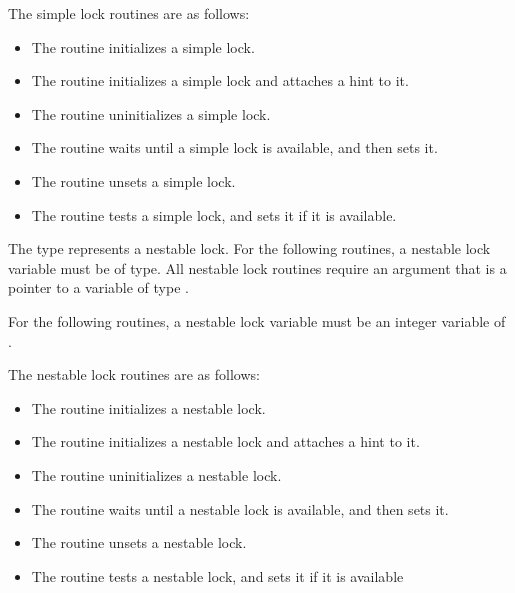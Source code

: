 The simple lock routines are as follows:

\begin{itemize}
\item The  routine initializes a simple lock.

\item The  routine initializes a simple lock and attaches a hint to it.

\item The  routine uninitializes a simple lock.

\item The  routine waits until a simple lock is available, and then sets it.

\item The  routine unsets a simple lock.

\item The  routine tests a simple lock, and sets it if it is available.
\end{itemize}

\ccppspecificstart
The type  represents a nestable lock. 
For the following routines, a nestable lock variable must be of  type. 
All nestable lock routines require an argument that is a pointer to a variable of type 
.
\ccppspecificend

\fortranspecificstart
For the following routines, a nestable lock variable must be an integer variable of 
.
\fortranspecificend

The nestable lock routines are as follows:

\begin{itemize}
\item The  routine initializes a nestable lock.

\item The  routine initializes a nestable lock and attaches a hint to it.

\item The  routine uninitializes a nestable lock.

\item The  routine waits until a nestable lock is available, and then 
sets it.

\item The  routine unsets a nestable lock.

\item The  routine tests a nestable lock, and sets it if it is 
available
\end{itemize}

